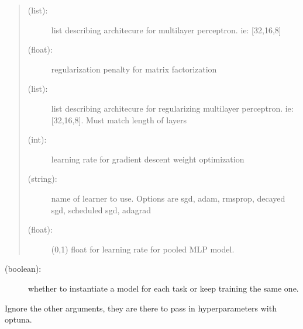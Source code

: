 \documentclass[letterpaper,10pt,english,openany,oneside]{sphinxmanual}
\begin{document}
\begin{fulllineitems}
\begin{description}
\begin{description}
\begin{quote}
\begin{description}
\item[{ (list):}] \leavevmode
list describing architecure for multilayer perceptron. ie: {[}32,16,8{]}

\item[{ (float):}] \leavevmode
regularization penalty for matrix factorization

\item[{ (list):}] \leavevmode
list describing architecure for regularizing multilayer perceptron. ie: {[}32,16,8{]}. Must match length of layers

\item[{ (int):}] \leavevmode
learning rate for gradient descent weight optimization

\item[{ (string):}] \leavevmode
name of learner to use. Options are sgd, adam, rmsprop, decayed sgd, scheduled sgd, adagrad

\item[{ (float):}] \leavevmode
(0,1) float for learning rate for pooled MLP model.

\end{description}
\end{quote}
\begin{description}
\item[{ (boolean):}] \leavevmode
whether to instantiate a model for each task or keep training the same one.

\end{description}

\end{description}

Ignore the other arguments, they are there to pass in hyperparameters with optuna.

\end{description}

\end{fulllineitems}

\end{document}
